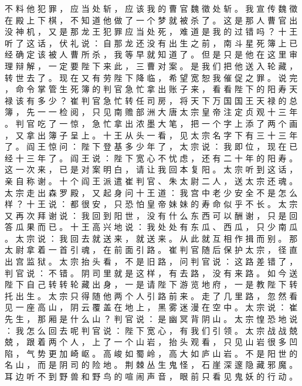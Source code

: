 {不 料 他 犯 罪 ， 应 当 处 斩 ， 应 该 我 的 曹 官 魏 徵 处 斩 。
我 宣 传 魏 徵 在 殿 上 下 棋 ， 不 知 道 他 做 了 一 个 梦 就 被 杀 了 。
这 是 那 人 曹 官 出 没 神 机 ， 又 是 那 龙 王 犯 罪 应 当 处 死 ， 难 道 是 我 的 过 错 吗 ？ 十 王 听 了 这 话 ， 伏 礼 说 ： 自 那 龙 还 没 有 出 生 之 前 ， 南 斗 星 死 簿 上 已 经 确 定 该 被 人 曹 所 杀 ， 我 等 早 就 知 道 了 。
但 是 只 是 他 在 这 里 审 理 辩 解 ， 一 定 要 陛 下 来 此 ， 三 曹 对 案 。
是 我 们 把 他 送 入 轮 藏 ， 转 世 去 了 。
现 在 又 有 劳 陛 下 降 临 ， 希 望 宽 恕 我 催 促 之 罪 。
说 完 ， 命 令 掌 管 生 死 簿 的 判 官 急 忙 拿 出 账 子 来 ， 看 看 陛 下 的 阳 寿 天 禄 该 有 多 少 ？
崔 判 官 急 忙 转 任 司 房 ， 将 天 下 万 国 国 王 天 禄 的 总 簿 ， 先 一 一 检 阅 ， 只 见 南 赡 部 洲 大 唐 太 宗 皇 帝 注 定 贞 观 十 三 年 。
判 官 吃 了 一 惊 ， 急 忙 拿 出 浓 墨 大 笔 ， 把 一 个 字 上 添 了 两 个 画 ， 又 拿 出 簿 子 呈 上 。
十 王 从 头 一 看 ， 见 太 宗 名 字 下 有 三 十 三 年 了 。 阎 王 惊 问 ： 陛 下 登 基 多 少 年 了 ， 太 宗 说 ： 我 即 位 ， 现 在 已 经 十 三 年 了 。
阎 王 说 ： 陛 下 宽 心 不 忧 虑 ， 还 有 二 十 年 的 阳 寿 。
这 一 次 来 ， 已 是 对 案 明 白 ， 请 让 我 回 本 复 阳 。
太 宗 听 到 这 话 ， 亲 自 称 谢 。
十 个 阎 王 派 遣 崔 判 官 、 朱 太 尉 二 人 ， 送 太 宗 还 魂 。
太 宗 走 出 森 罗 殿 ， 又 起 身 问 十 王 道 ： 我 宫 中 老 少 安 全 不 是 怎 么 样 ？ 十 王 说 ： 都 很 安 ， 只 恐 怕 皇 帝 妹 妹 的 寿 命 似 乎 不 长 。
太 宗 又 再 次 拜 谢 说 ： 我 回 到 阳 世 ， 没 有 什 么 东 西 可 以 酬 谢 ， 只 是 回 答 瓜 果 而 已 。
十 王 高 兴 地 说 ： 我 处 处 有 东 瓜 、 西 瓜 ， 只 少 南 瓜 。
太 宗 说 ： 我 回 去 就 送 来 ， 就 送 来 。
从 此 就 互 相 作 揖 而 别 。
那 太 尉 拿 着 一 首 引 魂 ， 在 前 面 引 路 。
崔 判 官 随 后 保 护 太 宗 ， 径 直 出 宫 监 狱 。
太 宗 抬 头 看 ， 不 是 旧 路 ， 问 判 官 说 ： 这 路 差 错 了 ， 判 官 说 ： 不 错 。
阴 司 里 就 是 这 样 ， 有 去 路 ， 没 有 来 路 。
如 今 送 陛 下 自 己 转 转 轮 藏 出 身 ， 一 是 请 陛 下 游 览 地 府 ， 一 是 教 陛 下 转 托 出 生 。
太 宗 只 得 随 他 两 个 人 引 路 前 来 。
走 了 几 里 路 ， 忽 然 看 见 一 座 高 山 ， 阴 云 覆 盖 在 地 上 ， 黑 雾 迷 漫 在 空 中 。
太 宗 说 ： 崔 先 生 ， 那 厢 是 什 么 山 ？ 判 官 说 ： 是 幽 冥 背 阴 山 。
太 宗 惶 恐 地 说 ： 我 怎 么 回 去 呢 判 官 说 ： 陛 下 宽 心 ， 有 我 们 引 领 。
太 宗 战 战 兢 兢 ， 跟 着 两 个 人 ， 上 了 一 个 山 岩 ， 抬 头 观 看 ， 只 见 山 岩 很 多 凹 陷 ， 气 势 更 加 崎 岖 。
高 峻 如 蜀 岭 ， 高 大 如 庐 山 岩 。
不 是 阳 世 的 名 山 ， 而 是 阴 司 的 险 地 。
荆 棘 丛 生 鬼 怪 ， 石 崖 深 邃 隐 藏 邪 魔 。
耳 边 听 不 到 野 兽 和 野 鸟 的 喧 闹 声 音 ， 眼 前 只 看 见 鬼 妖 的 行 动 。
}
